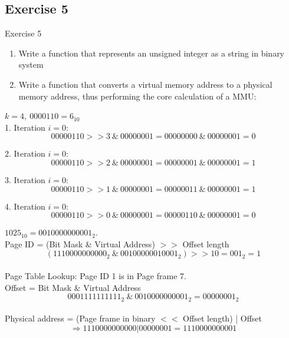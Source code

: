 \documentclass[10pt]{beamer}
\begin{document}
\subsection*{Exercise 5}
\frame{\subsectionpage}
\begin{frame}{Exercise 5}
	\begin{enumerate}
		\item%
			Write a function that represents an unsigned integer as a string in binary system
		\item%
			Write a function that converts a virtual memory address to a physical memory address,
			thus performing the core calculation of a MMU:
	\end{enumerate}
	\framebreak
	
	
	\framebreak
	
        $k = 4, \ 0000110 = 6_{10}$ \\
        1. Iteration $i=0$:
        \[ 00000110 >> 3 \ \& \ 00000001 = 00000000 \ \& \ 00000001 = 0\]

        2. Iteration $i=0$:
        \[ 00000110 >> 2 \ \& \ 00000001 = 00000001 \ \& \ 00000001 = 1\]
        
        3. Iteration $i=0$:
        \[ 00000110 >> 1 \ \& \ 00000001 = 00000011 \ \& \ 00000001 = 1\]
        
        4. Iteration $i=0$:
        \[ 00000110 >> 0 \ \& \ 00000001 = 00000110 \ \& \ 00000001 = 0\]
        
        \framebreak
        
        
        \framebreak
        
        $1025_{10} = 0010000000001_2$. \\ \vspace{0.4cm}
        Page ID = (Bit Mask \& Virtual Address) $>>$ Offset length
            \[ (1110000000000_2 \ \& \ 00100000010001_2) >> 10 = 001_2 = 1 \] \\
        Page Table Lookup: Page ID 1 is in Page frame 7. \\ \vspace{0.4cm}
        Offset = Bit Mask \& Virtual Address
            \[ 0001111111111_2 \ \& \ 0010000000001_2  = 00000001_2 \] \\
        Physical address = (Page frame in binary $<<$ Offset length) | Offset \\
        \[\Rightarrow 111 0000000000 | 00000001 = 111 0000000001\]

\end{frame}
\end{document}
